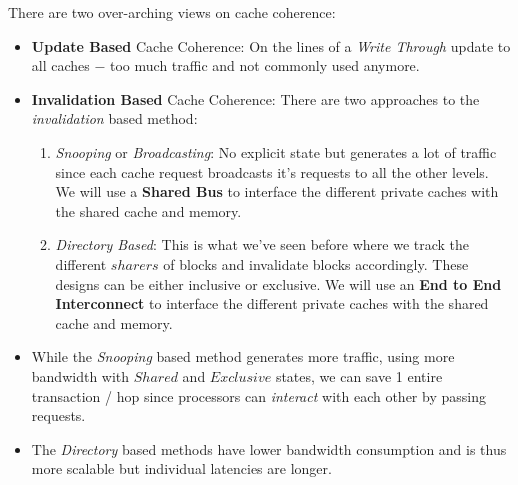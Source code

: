 \documentclass[12pt]{article}
\newenvironment{QandA}{\begin{enumerate}[label=\bfseries\arabic*.]\bfseries}
                      {\end{enumerate}}
\newenvironment{answered}{\par\quad\normalfont}{}
\begin{document}
\begin{QandA}
\begin{answered}
There are two over-arching views on cache coherence:
\begin{itemize}
    \item \textbf{Update Based} Cache Coherence: On the lines of a \textit{Write Through} update to all caches $-$ too much traffic and not commonly used anymore.
    \item \textbf{Invalidation Based} Cache Coherence: There are two approaches to the \textit{invalidation} based method:
    \begin{enumerate}
        \item \textit{Snooping} or \textit{Broadcasting}: No explicit state but generates a lot of traffic since each cache request broadcasts it's requests to all the other levels. We will use a \textbf{Shared Bus} to interface the different private caches with the shared cache and memory. 
        \item \textit{Directory Based}: This is what we've seen before where we track the different $sharers$ of blocks and invalidate blocks accordingly. These designs can be either inclusive or exclusive. We will use an \textbf{End to End Interconnect} to interface the different private caches with the shared cache and memory. 
    \end{enumerate}
    \item While the \textit{Snooping} based method generates more traffic, using more bandwidth with $Shared$ and $Exclusive$ states, we can save 1 entire transaction / hop since processors can \textit{interact} with each other by passing requests. 
    \item The \textit{Directory} based methods have lower bandwidth consumption and is thus more scalable but individual latencies are longer. 
\end{itemize}
\end{answered}

\end{QandA}

\newpage
\end{document}
